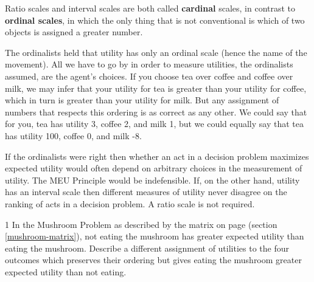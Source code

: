 
Ratio scales and interval scales are both called \textbf{cardinal} scales, in
contrast to \textbf{ordinal scales}, in which the only thing that is not
conventional is which of two objects is assigned a greater number.

The ordinalists held that utility has only an ordinal scale (hence the name of
the movement). All we have to go by in order to measure utilities, the
ordinalists assumed, are the agent's choices. If you choose tea over coffee and
coffee over milk, we may infer that your utility for tea is greater than your
utility for coffee, which in turn is greater than your utility for milk. But any
assignment of numbers that respects this ordering is as correct as any other. We
could say that for you, tea has utility 3, coffee 2, and milk 1, but we could
equally say that tea has utility 100, coffee 0, and milk -8.

If the ordinalists were right then whether an act in a decision problem
maximizes expected utility would often depend on arbitrary choices in the
measurement of utility. The MEU Principle would be indefensible.
If, on the other hand, utility has an interval scale then different measures of
utility never disagree on the ranking of acts in a decision problem. A ratio
scale is not required.

\begin{exercise}{1}
  In the Mushroom Problem as described by the matrix on page
  \pageref{mushroom-matrix} (section \ref{mushroom-matrix}), not eating the
  mushroom has greater expected utility than eating the mushroom. Describe a
  different assignment of utilities to the four outcomes which preserves their
  ordering but gives eating the mushroom greater expected utility than not
  eating.
\end{exercise}



